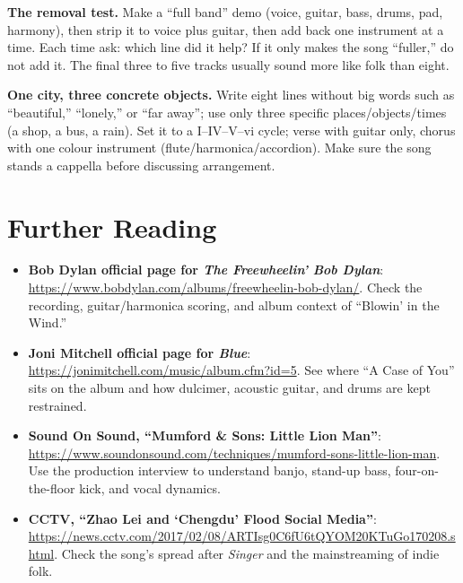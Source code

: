 \begin{exercise}
\textbf{The removal test.} Make a ``full band'' demo (voice, guitar, bass, drums, pad, harmony), then strip it to voice plus guitar, then add back one instrument at a time. Each time ask: which line did it help? If it only makes the song ``fuller,'' do not add it. The final three to five tracks usually sound more like folk than eight.
\end{exercise}

\begin{exercise}
\textbf{One city, three concrete objects.} Write eight lines without big words such as ``beautiful,'' ``lonely,'' or ``far away''; use only three specific places/objects/times (a shop, a bus, a rain). Set it to a I--IV--V--vi cycle; verse with guitar only, chorus with one colour instrument (flute/harmonica/accordion). Make sure the song stands a cappella before discussing arrangement.
\end{exercise}

\section{Further Reading}
\label{sec:folk-reading}

\begin{sloppypar}
\begin{itemize}
\item \textbf{Bob Dylan official page for \emph{The Freewheelin' Bob Dylan}}: \url{https://www.bobdylan.com/albums/freewheelin-bob-dylan/}. Check the recording, guitar/harmonica scoring, and album context of ``Blowin' in the Wind.''
\item \textbf{Joni Mitchell official page for \emph{Blue}}: \url{https://jonimitchell.com/music/album.cfm?id=5}. See where ``A Case of You'' sits on the album and how dulcimer, acoustic guitar, and drums are kept restrained.
\item \textbf{Sound On Sound, ``Mumford \& Sons: Little Lion Man''}: \url{https://www.soundonsound.com/techniques/mumford-sons-little-lion-man}. Use the production interview to understand banjo, stand-up bass, four-on-the-floor kick, and vocal dynamics.
\item \textbf{CCTV, ``Zhao Lei and `Chengdu' Flood Social Media''}: \url{https://news.cctv.com/2017/02/08/ARTIsg0C6fU6tQYOM20KTuGo170208.shtml}. Check the song's spread after \emph{Singer} and the mainstreaming of indie folk.
\end{itemize}
\end{sloppypar}

